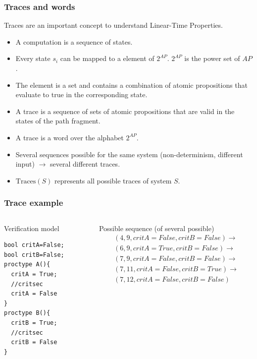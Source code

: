\documentclass{beamer}
\begin{document}
\begin{frame}
  \frametitle{Traces and words}
  Traces are an important concept to understand Linear-Time Properties.
  \begin{itemize}
  \item A computation is a sequence of states.
  \item Every state $s_i$ can be mapped to a element of $2^{AP}$. $2^{AP}$ is the power set of $AP$.
  \item The element is a set and contains a combination of atomic propositions that evaluate to true in the corresponding state.
  \item A trace is a sequence of sets of atomic propositions that are valid in the states of the path fragment.
  \item A trace is a word over the alphabet $2^{AP}$.
  \item Several sequences possible for the same system (non-determinism, different input) $\rightarrow$ several different traces.
  \item $\text{Traces}(S)$ represents all possible traces of system $S$.
  \end{itemize}
\end{frame}

\begin{frame}[fragile]
  \frametitle{Trace example}
  \begin{columns}
    \begin{column}{.4\textwidth}
      \begin{block}{Verification model}
        \begin{lstlisting}[]
bool critA=False;
bool critB=False;
proctype A(){
  critA = True;
  //critsec
  critA = False
}
proctype B(){
  critB = True;
  //critsec
  critB = False
}
\end{lstlisting}
      \end{block}
    \end{column}

    \begin{column}{.6\textwidth}
      \begin{block}{Possible sequence (of several possible)}
        \begin{equation*}
  \label{eq:path}
  \begin{split}
(4,9,critA=False,critB=False) \rightarrow \\
(6, 9, critA=True,critB=False) \rightarrow \\
(7, 9, critA=False,critB=False) \rightarrow \\
(7,11,critA=False,critB=True) \rightarrow \\
(7,12,critA=False,critB=False)
  \end{split}
\end{equation*}
      \end{block}
    \end{column}
  \end{columns}
\end{frame}
\end{document}
